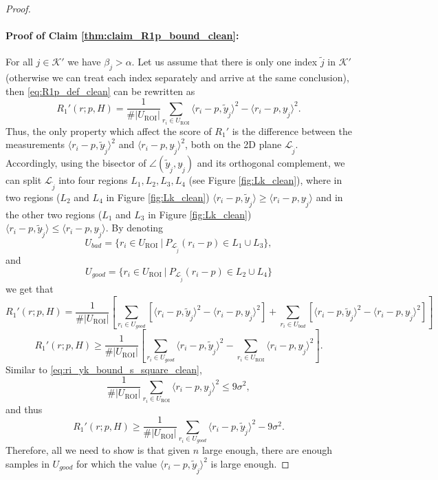 \documentclass[12pt]{article}
\theoremstyle{remark}
\newcommand{\KK}{\mathcal{K}}
\newcommand{\LL}{\mathcal{L}}
\newcommand{\lrangle}[1]{\langle #1 \rangle}
\begin{document}
\begin{proof}
\paragraph*{Proof of Claim \ref{thm:claim_R1p_bound_clean}:}
For all $j\in \KK'$ we have $\beta_j>\alpha$.
Let us assume that there is only one index $\tilde j$ in $\KK'$ (otherwise we can treat each index separately and arrive at the same conclusion), then \eqref{eq:R1p_def_clean} can be rewritten as
\[
R_1'(r; p, H) = \frac{1}{\#|U_\textrm{ROI}|}\sum\limits_{r_i\in U_\textrm{ROI}}  \langle r_i - p, \tilde{y}_{\tilde j} \rangle^2 - \langle r_i - p, {y}_{\tilde j} \rangle^2
.\]
Thus, the only property which affect the score of $R_1'$ is the difference between the measurements $\langle r_i - p, \tilde{y}_{\tilde j} \rangle^2$ and $\langle r_i - p, {y}_{\tilde j} \rangle^2$, both on the 2D plane $\LL_{\tilde j}$.
Accordingly, using the bisector of $\angle(\tilde y_{\tilde  j}, y_{\tilde  j})$ and its orthogonal complement, we can split $\LL_{\tilde j}$ into four regions $L_1, L_2, L_3, L_4$ (see Figure \ref{fig:Lk_clean}), where in two regions ($L_2$ and $L_4$ in Figure \ref{fig:Lk_clean}) $\lrangle{r_i - p, \tilde y_{\tilde j}} \geq \lrangle{r_i - p, y_{\tilde j}}$ and in the other two regions ($L_1$ and $L_3$ in Figure \ref{fig:Lk_clean}) $\lrangle{r_i - p, \tilde y_{\tilde j}} \leq \lrangle{r_i - p, y_{\tilde j}}$.
By denoting 
$$U_{bad} = \{r_i \in U_\textrm{ROI} ~|~ P_{\LL_{\tilde j}}(r_i - p)\in L_1 \cup L_3\},$$
and
$$U_{good} = \{r_i \in U_\textrm{ROI} ~|~ P_{\LL_{\tilde j}}(r_i - p)\in L_2 \cup L_4\}$$
we get that
\[
R_1'(r; p, H) = \frac{1}{\#|U_\textrm{ROI}|}\left[\sum\limits_{r_i\in U_{good}}\left[  \langle r_i - p, \tilde{y}_{\tilde j} \rangle^2 - \langle r_i - p, {y}_{\tilde j} \rangle^2\right] + \sum\limits_{r_i\in U_{bad}} \left[ \langle r_i - p, \tilde{y}_{\tilde j} \rangle^2 - \langle r_i - p, {y}_{\tilde j} \rangle^2\right]\right]
\]
\[
R_1'(r; p, H) \geq \frac{1}{\#|U_\textrm{ROI}|}\left[\sum\limits_{r_i\in U_{good}}  \langle r_i - p, \tilde{y}_{\tilde j} \rangle^2 - \sum\limits_{r_i\in U_\textrm{ROI}} \langle r_i - p, {y}_{\tilde j} \rangle^2\right]
.\]
Similar to \eqref{eq:ri_yk_bound_s_square_clean}, 
\[
\frac{1}{\#|U_\textrm{ROI}|}\sum\limits_{r_i\in U_\textrm{ROI}} \langle r_i - p, {y}_{\tilde j} \rangle^2 \leq 9 \sigma^2
,\]
and thus
\[
R_1'(r; p, H) \geq \frac{1}{\#|U_\textrm{ROI}|}\sum\limits_{r_i\in U_{good}}  \langle r_i - p, \tilde{y}_{\tilde j} \rangle^2
-9\sigma^2
.\]
Therefore, all we need to show is that given $n$ large enough, there are enough samples in $U_{good}$ for which the value $\lrangle{r_i - p, \tilde y_{\tilde j}}^2$ is large enough.

\end{proof}
\end{document}
